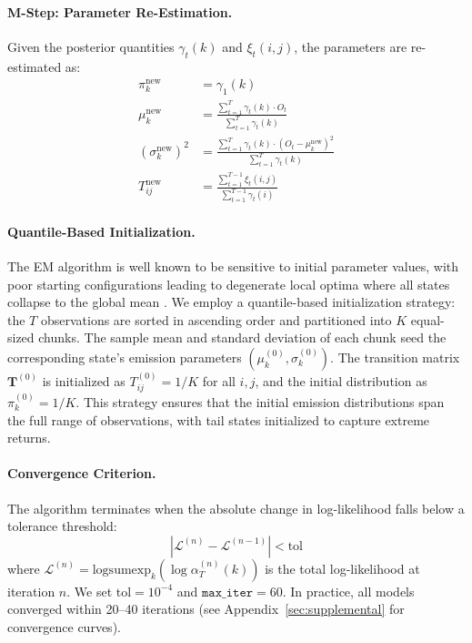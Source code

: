 \paragraph{M-Step: Parameter Re-Estimation.}
Given the posterior quantities $\gamma_t(k)$ and $\xi_t(i,j)$, the parameters are re-estimated as:
\begin{align}
    \pi_k^{\text{new}} &= \gamma_1(k) \label{eq:pi_update} \\[4pt]
    \mu_k^{\text{new}} &= \frac{\displaystyle\sum_{t=1}^{T} \gamma_t(k) \cdot O_t}{\displaystyle\sum_{t=1}^{T} \gamma_t(k)} \label{eq:mu_update} \\[4pt]
    \left(\sigma_k^{\text{new}}\right)^2 &= \frac{\displaystyle\sum_{t=1}^{T} \gamma_t(k) \cdot (O_t - \mu_k^{\text{new}})^2}{\displaystyle\sum_{t=1}^{T} \gamma_t(k)} \label{eq:sigma_update} \\[4pt]
    T_{ij}^{\text{new}} &= \frac{\displaystyle\sum_{t=1}^{T-1} \xi_t(i,j)}{\displaystyle\sum_{t=1}^{T-1} \gamma_t(i)} \label{eq:T_update}
\end{align}

\paragraph{Quantile-Based Initialization.}
The EM algorithm is well known to be sensitive to initial parameter values, with poor starting configurations leading to degenerate local optima where all states collapse to the global mean \citep{rabiner1986introduction}.
We employ a quantile-based initialization strategy: the $T$ observations are sorted in ascending order and partitioned into $K$ equal-sized chunks.
The sample mean and standard deviation of each chunk seed the corresponding state's emission parameters $(\mu_k^{(0)}, \sigma_k^{(0)})$.
The transition matrix $\mathbf{T}^{(0)}$ is initialized as $T_{ij}^{(0)} = 1/K$ for all $i, j$, and the initial distribution as $\pi_k^{(0)} = 1/K$.
This strategy ensures that the initial emission distributions span the full range of observations, with tail states initialized to capture extreme returns.

\paragraph{Convergence Criterion.}
The algorithm terminates when the absolute change in log-likelihood falls below a tolerance threshold:
\begin{equation}
    |\mathcal{L}^{(n)} - \mathcal{L}^{(n-1)}| < \text{tol}
    \label{eq:convergence}
\end{equation}
where $\mathcal{L}^{(n)} = \text{logsumexp}_{k}(\log \alpha_T^{(n)}(k))$ is the total log-likelihood at iteration $n$.
We set $\text{tol} = 10^{-4}$ and $\texttt{max\_iter} = 60$.
In practice, all models converged within 20--40 iterations (see Appendix~\ref{sec:supplemental} for convergence curves).

